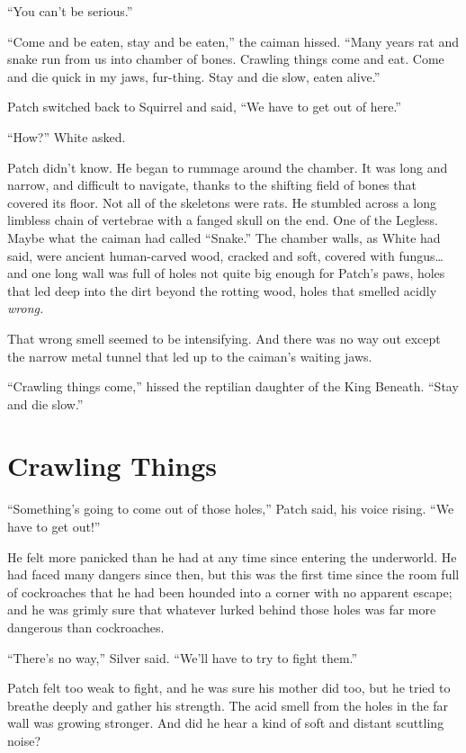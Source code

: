 \documentclass[ebook,oneside,openany,17pt]{memoir}
\newenvironment{tolerant}[1]{%
  \par\tolerance=#1\relax
}{%
  \par
}
\renewcommand{\thechapter}{\Roman{chapter}}
\newcounter{sections}
\newcommand{\sections}[1]{%
  \section*{#1}
  \addtocounter{sections}{1}%
  \pdfbookmark[1]{#1}{section.\thechapter.\thesections}}
\begin{document}
“You can’t be serious.”

\begin{tolerant}{1000}
“Come and be eaten, stay and be eaten,” the cai\-man hissed. “Many years
rat and snake run from us into chamber of bones. Crawling things come
and eat. Come and die quick in my jaws, fur-thing. Stay and die slow,
eaten alive.”
\end{tolerant}

Patch switched back to Squirrel and said, “We have to get out of
here.”

“How?” White asked.

Patch didn’t know. He began to rummage around the chamber. It was long
and narrow, and difficult to navigate, thanks to the shifting field of
bones that covered its floor. Not all of the skeletons were rats. He
stumbled across a long limbless chain of vertebrae with a fanged skull
on the end. One of the Legless. Maybe what the caiman had called
“Snake.” The chamber walls, as White had said, were ancient
human-carved wood, cracked and soft, covered with fungus… and one long
wall was full of holes not quite big enough for Patch’s paws, holes
that led deep into the dirt beyond the rotting wood, holes that
smelled acidly \emph{wrong.}

That wrong smell seemed to be intensifying. And there was no way out
except the narrow metal tunnel that led up to the caiman’s waiting
jaws.

\begin{tolerant}{1000}
“Crawling things come,” hissed the reptilian daughter of the King
Beneath. “Stay and die slow.”
\end{tolerant}


\sections{Crawling Things}

“Something’s going to come out of those holes,” Patch said, his voice
rising. “We have to get out!”

\begin{tolerant}{500}
He felt more panicked than he had at any time since entering the
underworld. He had faced many dangers since then, but this was the
first time since the room full of cockroaches that he had been hound\-ed
into a corner with no apparent escape; and he was grimly sure that
whatever lurked behind those holes was far more dangerous than
cockroaches.
\end{tolerant}

“There’s no way,” Silver said. “We’ll have to try to fight them.”

Patch felt too weak to fight, and he was sure his mother did too, but
he tried to breathe deeply and gather his strength. The acid smell
from the holes in the far wall was growing stronger. And did he hear a
kind of soft and distant scuttling noise?
\end{document}
